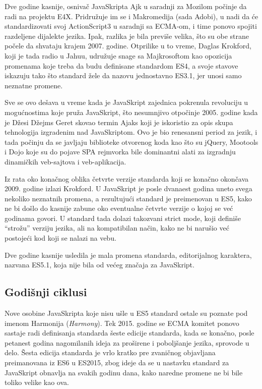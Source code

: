 Dve godine kasnije, osnivač JavaSkripta Ajk u saradnji za Mozilom počinje da radi na projektu E4X.
Pridružuje im se i Makromedija (sada Adobi), u nadi da će standardizovati svoj ActionScript3 u saradnji sa ECMA-om, i time ponovo spojiti razdeljene dijalekte jezika.
Ipak, razlika je bila previše velika, što su obe strane počele da shvataju krajem 2007. godine.
Otprilike u to vreme, Daglas Krokford, koji je tada radio u Jahuu, udružuje snage sa Majkrosoftom kao opozicija promenama koje treba da budu definisane standardom ES4, a svoje stavove iskazuju tako što standard žele da nazovu jednostavno ES3.1, jer unosi samo neznatne promene.

Sve se ovo dešava u vreme kada je JavaSkript zajednica pokrenula revoluciju u mogućnostima koje pruža JavaSkript, što nesumnjivo otpočinje 2005. godine
kada je Džesi Džejms Geret skovao termin Ajaks koji je iskoristio za opis skupa tehnologija izgradenim nad JavaSkriptom.
Ovo je bio renesansni period za jezik, i tada počinju da se javljaju biblioteke otvorenog koda kao što su jQuery, Mootools i Dojo koje su do pojave SPA  rejmvorka bile dominantni alati za izgradnju dinamičkih veb-sajtova i veb-aplikacija.

Iz rata oko konačnog oblika četvrte verzije standarda koji se konačno okončava 2009. godine izlazi Krokford.
U JavaSkript je posle dvanaest godina uneto svega nekoliko neznatnih promena, a rezultujući standard je preimenovan u ES5, kako ne bi došlo do kasnije zabune oko eventualne četvrte verzije o kojoj se već godinama govori.
U standard tada dolazi takozvani strict mode, koji definiše “strožu” verziju jezika, ali na kompatibilan način, kako ne bi narušio već postojeći kod koji se nalazi na vebu.

Dve godine kasnije usledila je mala promena standarda, editorijalnog karaktera, nazvana ES5.1, koja nije bila od većeg značaja za JavaSkript.

\subsection{Godišnji ciklusi}

Nove osobine JavaSkripta koje nisu ušle u ES5 standard ostale su poznate pod imenom Harmonija (\textsl{Harmony}).
Tek 2015. godine se ECMA komitet ponovo sastaje radi definisanja standarda šeste edicije standarda, kada se konačno, posle petanest godina nagomilanih ideja za proširene i poboljšanje jezika, sprovode u delo.
Šesta edicija standarda je vrlo kratko pre zvaničnog objavljana preimanovana iz ES6 u ES2015, zbog ideje da se u nastavku standard za JavaSkript obnavlja na svakih godinu dana, kako naredne promene ne bi bile toliko velike kao ova.

